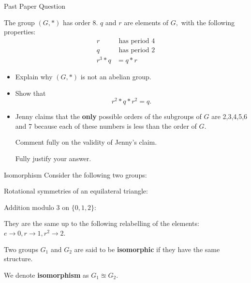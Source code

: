 \documentclass[8pt]{beamer}
\begin{document}
\begin{frame}{Past Paper Question}
	\begin{Problem}
		The group $(G,*)$ has order 8.
		$q$ and  $r$ are elements of  $G,$ with the following properties:
		\begin{align*}
			r& \text{ has period 4} \\
			q& \text{ has period 2} \\
			r^3*q &= q*r \end{align*} 
		\begin{itemize}
			\item Explain why $(G,*)$ is not an abelian group.
			\item Show that \[
			r^2*q*r^2=q
			.\] 
		\item Jenny claims that the \textbf{only} possible orders of the subgroups of $G$ are 2,3,4,5,6 and 7 because each of these numbers is less than the order of  $G$.

			Comment fully on the validity of Jenny's claim.

			Fully justify your answer.
		\end{itemize}

	\end{Problem}
	



\end{frame}

\begin{frame}{Isomorphism}
	Consider the following two groups:

	Rotational symmetries of an equilateral triangle:

	Addition modulo 3 on $\{0,1,2\}$:

	They are the same up to the following relabelling of the elements:  $e \rightarrow 0, r \rightarrow 1, r^2 \rightarrow 2$.

	 \begin{definition}
		Two groups $ G_1$ and $ G_2$ are said to be \textbf{isomorphic}  if they have the same structure.

		We denote \textbf{isomorphism} as $ G_1 \approxeq G_2$. 
	\end{definition}
	
\end{frame}
\end{document}
